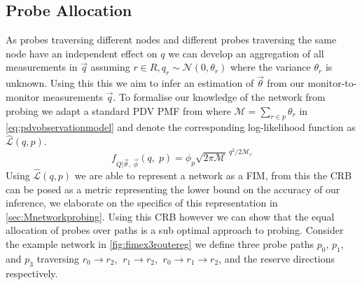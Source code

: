 \subsection{Probe Allocation}
\label{ssec:Mpallocation}

As probes traversing different nodes and different probes traversing the same node have an independent effect on $q$ we can develop an aggregation of all measurements in $\vec{q}$ assuming $r\in R, q_r \sim \mathcal{N}(0, \theta_r)$ where the variance $\theta_r$ is unknown. Using this this we aim to infer an estimation of $\vec{\theta}$ from our monitor-to-monitor measurements $\vec{q}$. To formalise our knowledge of the network from probing we adapt a standard PDV PMF from \cite{he_network_2021} where $\mathcal{M} = \sum_{r\in p}\theta_r$ in \cref{eq:pdvobservationmodel} and denote the corresponding log-likelihood function as $\widehat{\mathcal{L}}(q, p)$.
\begin{equation}
\label{eq:pdvobservationmodel}
    f_{Q|\vec{\theta},\; \vec{\phi}}(q,\;p) = \phi_p \sqrt{2\pi\mathcal{M}}^{\ q^2/{2\mathcal{M}_r}}
\end{equation}
Using $\widehat{\mathcal{L}}(q, p)$ we are able to represent a network as a FIM, from this the CRB can be posed as a metric representing the lower bound on the accuracy of our inference, we elaborate on the specifics of this representation in \cref{sec:Mnetworkprobing}. Using this CRB however we can show that the equal allocation of probes over paths is a sub optimal approach to probing. Consider the example network in \cref{fig:fimex3routereg} we define three probe paths $p_0$, $p_1$, and $p_3$ traversing $r_0\rightarrow r_2$, $\ r_1\rightarrow r_2$, $\ r_0\rightarrow r_1\rightarrow r_2$, and the reserve directions respectively.
